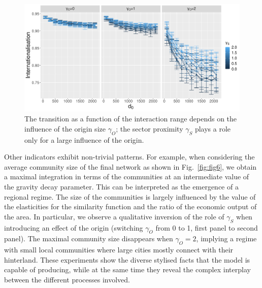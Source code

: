 \documentclass[10pt,letterpaper]{article}
\begin{document}
\begin{figure}
    \includegraphics[width=\linewidth]{figures/Fig5.png}
    \caption{The transition as a function of the interaction range depends on the influence of the origin size $\gamma_O$; the sector proximity $\gamma_S$ plays a role only for a large influence of the origin.\label{fig:fig5}}
\end{figure}

Other indicators exhibit non-trivial patterns. For example, when considering the average community size of the final network as shown in Fig.~\ref{fig:fig6}, we obtain a maximal integration in terms of the communities at an intermediate value of the gravity decay parameter. This can be interpreted as the emergence of a regional regime. The size of the communities is largely influenced by the value of the elasticities for the similarity function and the ratio of the economic output of the area. In particular, we observe a qualitative inversion of the role of $\gamma_S$ when introducing an effect of the origin (switching $\gamma_O$ from 0 to 1, first panel to second panel). The maximal community size disappears when $\gamma_O = 2$, implying a regime with small local communities where large cities mostly connect with their hinterland. These experiments show the diverse stylised facts that the model is capable of producing, while at the same time they reveal the complex interplay between the different processes involved.
\end{document}
